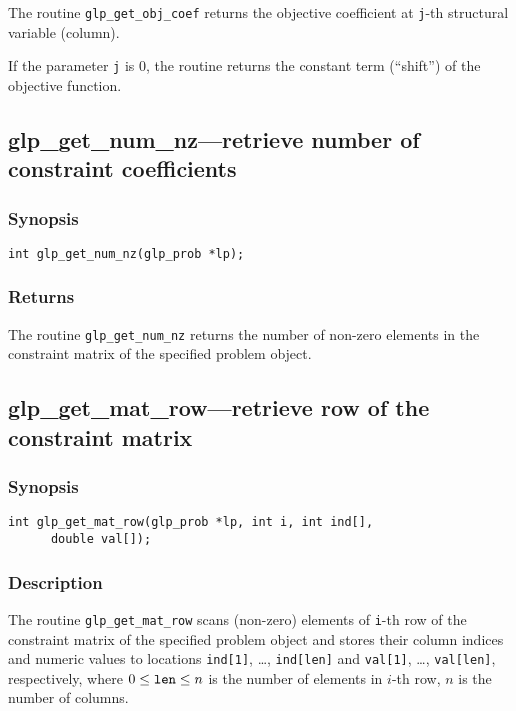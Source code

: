 The routine \verb|glp_get_obj_coef| returns the objective coefficient
at \verb|j|-th structural variable (column).

If the parameter \verb|j| is 0, the routine returns the constant term
(``shift'') of the objective function.

\subsection{glp\_get\_num\_nz---retrieve number of constraint
coefficients}

\subsubsection*{Synopsis}

\begin{verbatim}
int glp_get_num_nz(glp_prob *lp);
\end{verbatim}

\subsubsection*{Returns}

The routine \verb|glp_get_num_nz| returns the number of non-zero
elements in the constraint matrix of the specified problem object.

\subsection{glp\_get\_mat\_row---retrieve row of the constraint
matrix}

\subsubsection*{Synopsis}

\begin{verbatim}
int glp_get_mat_row(glp_prob *lp, int i, int ind[],
      double val[]);
\end{verbatim}

\subsubsection*{Description}

The routine \verb|glp_get_mat_row| scans (non-zero) elements of
\verb|i|-th row of the constraint matrix of the specified problem object
and stores their column indices and numeric values to locations
\verb|ind[1]|, \dots, \verb|ind[len]| and \verb|val[1]|, \dots,
\verb|val[len]|, respectively, where $0\leq{\tt len}\leq n$ is the
number of elements in $i$-th row, $n$ is the number of columns.

